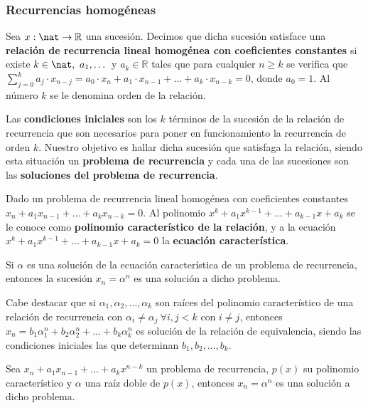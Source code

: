 \subsubsection{Recurrencias homogéneas}
\begin{ndef}
    Sea $x: \nat \rightarrow \mathbb{R}$ una sucesión. Decimos que dicha sucesión satisface una \textbf{relación de recurrencia lineal homogénea con coeficientes constantes}
    si existe $ k \in \nat, \ a_1, \dots$ y $a_k \in \mathbb{R}$ tales que para cualquier $n \geq k$ se verifica que
    $\sum_{j=0}^k a_j \cdot x_{n-j} = a_0 \cdot x_n + a_1 \cdot x_{n-1} + \ldots + a_k \cdot x_{n-k} = 0$,
    donde $a_0 = 1$.
    Al número $k$ se le denomina orden de la relación.
\end{ndef}


Las \textbf{condiciones iniciales} son los $k$ términos de la sucesión de la relación de recurrencia que son necesarios para poner en funcionamiento la recurrencia de orden $k$.
Nuestro objetivo es hallar dicha sucesión que satisfaga la relación, siendo esta situación un \textbf{problema de recurrencia} y cada una de las sucesiones son las \textbf{soluciones del problema de recurrencia}.


\begin{ndef}
    Dado un problema de recurrencia lineal homogénea con coeficientes constantes $x_n + a_1x_{n-1} + \ldots + a_kx_{n-k} = 0$. Al polinomio
    $x^k + a_1x^{k-1} + \ldots + a_{k-1}x + a_k$ se le conoce como \textbf{polinomio característico de la relación}, y a la ecuación
    $x^k + a_1x^{k-1} + \ldots + a_{k-1}x + a_k = 0$ la \textbf{ecuación característica}.
\end{ndef}

\begin{nprop}
    Si $\alpha$ es una solución de la ecuación característica de un problema de recurrencia, entonces la sucesión $x_n = \alpha^n$ es una solución a dicho problema.
\end{nprop}

Cabe destacar que si $\alpha_1, \alpha _2, \ldots, \alpha_k$ son raíces del polinomio característico de una relación de recurrencia con $\alpha_i \neq \alpha_j \ \forall i,j < k $ con $i \neq j$,
entonces $x_n = b_1\alpha_1^n + b_2\alpha_2^n + \ldots + b_k\alpha_k^n$ es solución de la relación de equivalencia, siendo las condiciones iniciales las que determinan $b_1, b_2, \ldots, b_k$.


\begin{nprop}
    Sea  $x_n + a_1x_{n-1} + \ldots + a_kx^{n-k}$ un problema de recurrencia, $p(x)$ su polinomio característico y $\alpha$ una raíz doble de $p(x)$, entonces
    $x_n = \alpha^n$ es una solución a dicho problema.
\end{nprop}

